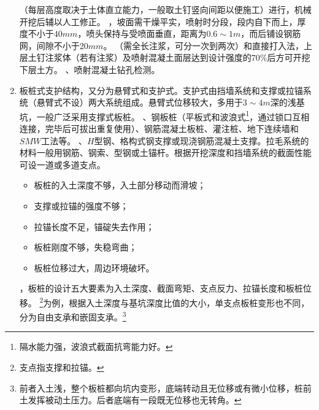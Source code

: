 \documentclass{book}
\begin{document}
\begin{enumerate}
\begin{figure*}[htbp]
\begin{center}
              \end{center}
          \end{figure*}
          （每层高度取决于土体直立能力，一般取土钉竖向间距以便施工）进行，机械开挖后辅以人工修正。
          ，坡面需干燥平实，喷射时分段，段内自下而上，厚度不小于$40mm$，喷头保持与受喷面垂直，距离为$0.6\sim1m$，而后铺设钢筋网，间隙不小于$20mm$。
          （需全长注浆，可分一次到两次）和直接打入法，上层土钉注浆体（若有注浆）及喷射混凝土面层达到设计强度的$70\%$后方可开挖下层土方。
          、喷射混凝土钻孔检测。
    \item 板桩式支护结构，又分为悬臂式和支护式。支护式由挡墙系统和支撑或拉锚系统（悬臂式不设）两大系统组成。悬臂式位移较大，多用于$3\sim4m$深的浅基坑，一般广泛采用支撑式板桩。
          、钢板桩（平板式和波浪式\footnote{隔水能力强，波浪式截面抗弯能力好。}，通过锁口互相连接，完毕后可拔出重复使用）、钢筋混凝土板桩、灌注桩、地下连续墙和$SMW$工法等。
          、$H$型钢、格构式钢支撑或现浇钢筋混凝土支撑。拉毛系统的材料一般用钢筋、钢索、型钢或土锚杆。根据开挖深度和挡墙系统的截面性能可设一道或多道支点。
          \begin{itemize}
              \item 板桩的入土深度不够，入土部分移动而滑坡；
              \item 支撑或拉锚的强度不够；
              \item 拉锚长度不足，锚碇失去作用；
              \item 板桩刚度不够，失稳弯曲；
              \item 板桩位移过大，周边环境破坏。
          \end{itemize}
          ，板桩的设计五大要素为入土深度、截面弯矩、支点反力、拉锚长度和板桩位移。
          \footnote{支点指支撑和拉锚。}为例，根据入土深度与基坑深度比值的大小，单支点板桩变形也不同，分为自由支承和嵌固支承。\footnote{前者入土浅，整个板桩都向坑内变形，底端转动且无位移或有微小位移，桩前土发挥被动土压力。后者底端有一段既无位移也无转角。}

\end{enumerate}
\end{document}
